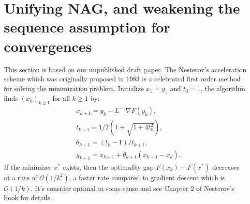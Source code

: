 \documentclass[12pt]{article}
\begin{document}
\section{Unifying NAG, and weakening the sequence assumption for convergences}\label{sec:unify-nes-acceleration}
    This section is based on our unpublished draft paper. 
    The Nesterov's acceleration scheme which was originally proposed in 1983 \cite{nesterov_method_1983} is a celebrated first order method for solving the minimization problem. 
    Initialize $x_1 = y_1$ and $t_0 = 1$, the algorithm finds $(x_k)_{k \ge 1}$ for all $k \ge 1$ by: 
    \begin{align}
        & x_{k + 1} = y_k - L^{-1}\nabla F(y_k), 
        \\
        & t_{k + 1} = 1/2\left(1 + \sqrt{1 + 4t_{k}^2}\right), 
        \\
        & \theta_{k + 1} = (t_{k} - 1)/t_{k + 1}, 
        \\
        & y_{k + 1} = x_{k + 1} + \theta_{k + 1}(x_{k + 1} - x_k). 
    \end{align}\label{eqn:example-algorithm}
    If the minimizer $x^*$ exists, then the optimality gap $F(x_k) - F(x^*)$ decreases at a rate of $\mathcal O(1/k^2)$, a faster rate compared to gradient descent which is $\mathcal O(1/k)$. 
    It's consider optimal in some sense and see Chapter 2 of Nesterov's book \cite{nesterov_lectures_2018} for details. 
\end{document}
